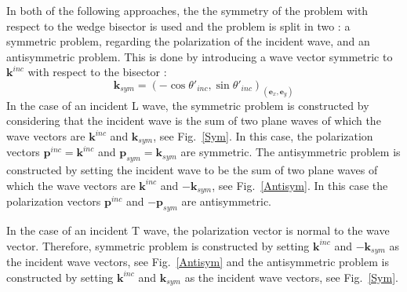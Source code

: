In both of the following approaches, the the symmetry of the problem with respect to the wedge bisector is used and the problem is split in two : a symmetric problem, regarding the polarization of the incident wave, and an antisymmetric problem. This is done by introducing a wave vector symmetric to $\mathbf{k}^{inc}$ with respect to the bisector :
\begin{equation}
\mathbf{k}_{sym}=(-\cos\theta'_{inc},\sin\theta'_{inc})_{(\mathbf{e}_x,\mathbf{e}_y)}
\end{equation}
In the case of an incident L wave, the symmetric problem is constructed by considering that the incident wave is the sum of two plane waves of which the wave vectors are $\mathbf{k}^{inc}$ and $\mathbf{k}_{sym}$, see Fig.~\ref{Sym}. In this case, the polarization vectors $\mathbf{p}^{inc}=\mathbf{k}^{inc}$ and $\mathbf{p}_{sym}=\mathbf{k}_{sym}$ are symmetric. The antisymmetric problem is constructed by setting the incident wave to be the sum of two plane waves of which the wave vectors are $\mathbf{k}^{inc}$ and $-\mathbf{k}_{sym}$, see Fig.~\ref{Antisym}. In this case the polarization vectors $\mathbf{p}^{inc}$ and $-\mathbf{p}_{sym}$ are antisymmetric.

In the case of an incident T wave, the polarization vector is normal to the wave vector. Therefore, symmetric problem is constructed by setting $\mathbf{k}^{inc}$ and $-\mathbf{k}_{sym}$ as the incident wave vectors, see Fig.~\ref{Antisym} and the antisymmetric problem is constructed by setting $\mathbf{k}^{inc}$ and $\mathbf{k}_{sym}$ as the incident wave vectors, see Fig.~\ref{Sym}.

